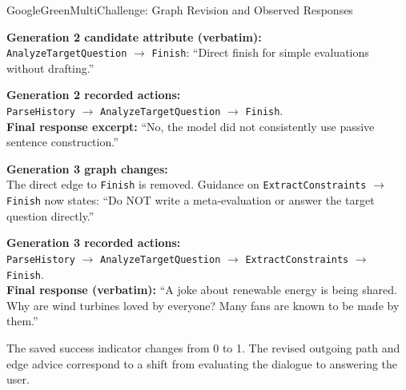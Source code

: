 \begin{tracebox}{GoogleGreen}{MultiChallenge: Graph Revision and Observed Responses}
\footnotesize\raggedright
\textbf{Generation 2 candidate attribute (verbatim):}\\
\texttt{AnalyzeTargetQuestion} $\rightarrow$ \texttt{Finish}: ``Direct finish for simple evaluations without drafting.''

\smallskip
\textbf{Generation 2 recorded actions:}\\
\texttt{ParseHistory} $\rightarrow$ \texttt{AnalyzeTargetQuestion} $\rightarrow$ \texttt{Finish}.\\
\textbf{Final response excerpt:} ``No, the model did not consistently use passive sentence construction.''

\smallskip
\textbf{Generation 3 graph changes:}\\
The direct edge to \texttt{Finish} is removed. Guidance on \texttt{ExtractConstraints} $\rightarrow$ \texttt{Finish} now states: ``Do NOT write a meta-evaluation or answer the target question directly.''

\smallskip
\textbf{Generation 3 recorded actions:}\\
\texttt{ParseHistory} $\rightarrow$ \texttt{AnalyzeTargetQuestion} $\rightarrow$ \texttt{ExtractConstraints} $\rightarrow$ \texttt{Finish}.\\
\textbf{Final response (verbatim):} ``A joke about renewable energy is being shared. Why are wind turbines loved by everyone? Many fans are known to be made by them.''
\end{tracebox}

The saved success indicator changes from 0 to 1. The revised outgoing path and edge advice correspond to a shift from evaluating the dialogue to answering the user.
